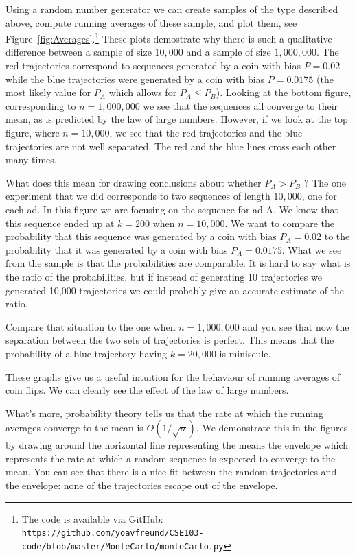 Using a random number generator we can create samples of the type
described above, compute running averages of these sample, and plot
them, see Figure~\ref{fig:Averages}.\footnote{The code is available
  via GitHub: {\tt
    https://github.com/yoavfreund/CSE103-code/blob/master/MonteCarlo/monteCarlo.py}}
These plots demostrate why there is such a qualitative difference
between a sample of size $10,000$ and a sample of size
$1,000,000$. The red trajectories correspond to sequences generated by
a coin with bias $P=0.02$ while the blue trajectories were generated
by a coin with bias $P=0.0175$ (the most likely value for $P_A$ which
allows for $P_A \leq P_B$). Looking at the bottom figure,
corresponding to $n=1,000,000$ we see that the sequences all converge
to their mean, as is predicted by the law of large numbers. However,
if we look at the top figure, where $n=10,000$, we see that the red
trajectories and the blue trajectories are not well separated. The red
and the blue lines cross each other many times.

What does this mean for drawing conclusions about whether $P_A>P_B$ ?
The one experiment that we did corresponds to two sequences of length
$10,000$, one for each ad. In this figure we are focusing on the
sequence for ad A. We know that this sequence ended up at $k=200$ when
$n=10,000$. We want to compare the probability that this sequence was
generated by a coin with bias $P_A=0.02$ to the probability that it
was generated by a coin with bias $P_A=0.0175$. What we see from the
sample is that the probabilities are comparable. It is hard to say
what is the ratio of the probabilities, but if instead of generating
10 trajectories we generated 10,000 trajectories we could probably
give an accurate estimate of the ratio.

Compare that situation to the one when $n=1,000,000$ and you see that
now the separation between the two sets of trajectories is perfect. This
means that the probability of a blue trajectory having $k=20,000$ is
miniscule.

These graphs give us a useful intuition for the behaviour of running
averages of coin flips. We can clearly see the effect of the law of
large numbers.

What's more, probability theory tells us that the rate at which the
running averages converge to the mean is $O(1/\sqrt{n})$. We
demonstrate this in the figures by drawing around the horizontal line
representing the means the envelope which represents the rate at which
a random sequence is expected to converge to the mean. You can see
that there is a nice fit between the random trajectories and the
envelope: none of the trajectories escape out of the envelope.

